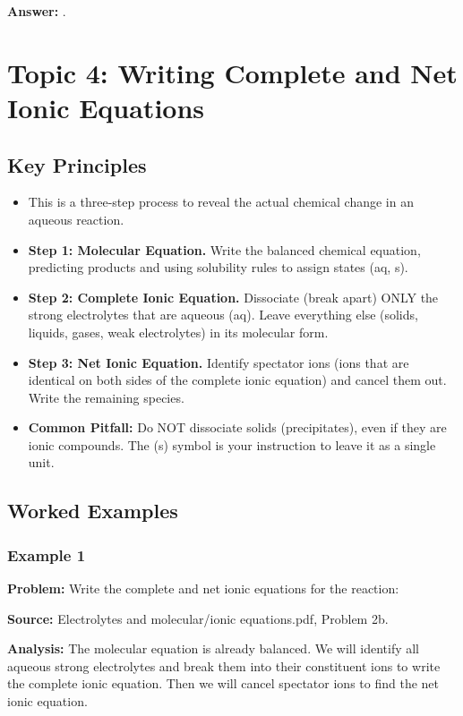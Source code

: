 \documentclass{article}
\begin{document}
\textbf{Answer:} \textbf{}.

\section{Topic 4: Writing Complete and Net Ionic Equations}
\subsection{Key Principles}
\begin{itemize}
    \item This is a three-step process to reveal the actual chemical change in an aqueous reaction.
    \item \textbf{Step 1: Molecular Equation.} Write the balanced chemical equation, predicting products and using solubility rules to assign states (aq, s).
    \item \textbf{Step 2: Complete Ionic Equation.} Dissociate (break apart) ONLY the strong electrolytes that are aqueous (aq). Leave everything else (solids, liquids, gases, weak electrolytes) in its molecular form.
    \item \textbf{Step 3: Net Ionic Equation.} Identify spectator ions (ions that are identical on both sides of the complete ionic equation) and cancel them out. Write the remaining species.
    \item \textbf{Common Pitfall:} Do NOT dissociate solids (precipitates), even if they are ionic compounds. The (s) symbol is your instruction to leave it as a single unit.
\end{itemize}

\subsection{Worked Examples}
\subsubsection{Example 1}
\textbf{Problem:} Write the complete and net ionic equations for the reaction: 

\textbf{Source:} Electrolytes and molecular/ionic equations.pdf, Problem 2b.

\textbf{Analysis:} The molecular equation is already balanced. We will identify all aqueous strong electrolytes and break them into their constituent ions to write the complete ionic equation. Then we will cancel spectator ions to find the net ionic equation.
\end{document}
